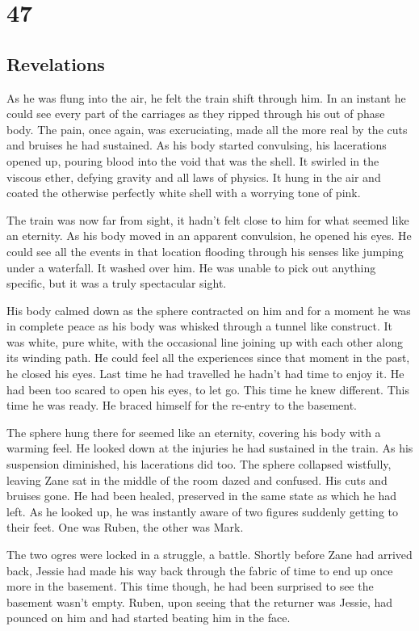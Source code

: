 \chapter{47}
\section{Revelations}


As he was flung into the air, he felt the train shift through him.  In an instant he could see every part of the carriages as they ripped through his out of phase body.  The pain, once again, was excruciating, made all the more real by the cuts and bruises he had sustained.  As his body started convulsing, his lacerations opened up, pouring blood into the void that was the shell.  It swirled in the viscous ether, defying gravity and all laws of physics.  It hung in the air and coated the otherwise perfectly white shell with a worrying tone of pink.

The train was now far from sight, it hadn't felt close to him for what seemed like an eternity.  As his body moved in an apparent convulsion, he opened his eyes.  He could see all the events in that location flooding through his senses like jumping under a waterfall.  It washed over him.  He was unable to pick out anything specific, but it was a truly spectacular sight.

His body calmed down as the sphere contracted on him and for a moment he was in complete peace as his body was whisked through a tunnel like construct.  It was white, pure white, with the occasional line joining up with each other along its winding path.  He could feel all the experiences since that moment in the past, he closed his eyes.  Last time he had travelled he hadn't had time to enjoy it.  He had been too scared to open his eyes, to let go.  This time he knew different.  This time he was ready.  He braced himself for the re-entry to the basement.  

The sphere hung there for seemed like an eternity, covering his body with a warming feel.  He looked down at the injuries he had sustained in the train.  As his suspension diminished, his lacerations did too.  The sphere collapsed wistfully, leaving Zane sat in the middle of the room dazed and confused.  His cuts and bruises gone.  He had been healed, preserved in the same state as which he had left.  As he looked up, he was instantly aware of two figures suddenly getting to their feet.  One was Ruben, the other was Mark.  

The two ogres were locked in a struggle, a battle.  Shortly before Zane had arrived back, Jessie had made his way back through the fabric of time to end up once more in the basement.  This time though, he had been surprised to see the basement wasn't empty.  Ruben, upon seeing that the returner was Jessie, had pounced on him and had started beating him in the face.  

